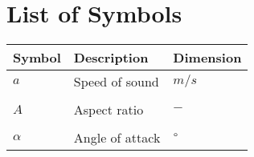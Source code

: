 \section*{List of Symbols}\label{cha:listofsymbols}
\begin{table}[h]
\centering
\begin{tabular}{l p{320pt} l}
Symbol & Description & Dimension\\
\hline
\hline
$a$ & Speed of sound & $m/s$\\
\hline
\\
\hline
$A$ & Aspect ratio & $-$\\
\hline
\\
\hline
$\alpha$ & Angle of attack & $\degree$\\
\hline
\end{tabular}
\end{table}